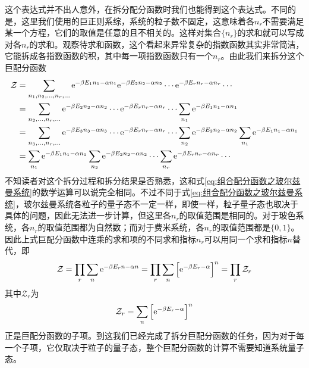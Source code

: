 \documentclass[../../main.tex]{subfiles}
\begin{document}
这个表达式并不出人意外，在拆分配分函数时我们也能得到这个表达式。不同的是，这里我们使用的巨正则系综，系统的粒子数不固定，这意味着各\(n_r\)不需要满足某一个方程，它们的取值是任意的且不相关的。这样对集合\(\{n_r\}\)的求和就可以写成对各\(n_r\)的求和。观察待求和函数，这个看起来异常复杂的指数函数其实非常简洁，它能拆成各指数函数的积，其中每一项指数函数只有一个\(n_r\)。由此我们来拆分这个巨配分函数
\begin{equation}\label{eq:拆分巨配分函数}
    \begin{split}
        \mathcal{Z}&=\sum_{n_1,n_2,\dots,n_r,\dots}\mathrm{e}^{-\beta E_1n_1-\alpha n_1}\mathrm{e}^{-\beta E_2n_2-\alpha n_2}\cdots\mathrm{e}^{-\beta E_rn_r-\alpha n_r}\cdots \\
        &=\sum_{n_2,\dots,n_r,\dots}\mathrm{e}^{-\beta E_2n_2-\alpha n_2}\cdots\mathrm{e}^{-\beta E_rn_r-\alpha n_r}\cdots\sum_{n_1}\mathrm{e}^{-\beta E_1n_1-\alpha n_1} \\
        &=\sum_{n_3,\dots,n_r,\dots}\mathrm{e}^{-\beta E_3n_3-\alpha n_3}\cdots\mathrm{e}^{-\beta E_rn_r-\alpha n_r}\cdots\sum_{n_2}\mathrm{e}^{-\beta E_2n_2-\alpha n_2}\sum_{n_1}\mathrm{e}^{-\beta E_1n_1-\alpha n_1} \\
        &=\sum_{n_1}\mathrm{e}^{-\beta E_1n_1-\alpha n_1}\sum_{n_2}\mathrm{e}^{-\beta E_2n_2-\alpha n_2}\cdots\sum_{n_r}\mathrm{e}^{-\beta E_rn_r-\alpha n_r}\cdots
    \end{split}
\end{equation}
不知读者对这个拆分过程和拆分结果是否熟悉，这和式\eqref{eq:组合配分函数之玻尔兹曼系统}的数学运算可以说完全相同。不过不同于式\eqref{eq:组合配分函数之玻尔兹曼系统}，玻尔兹曼系统各粒子的量子态不一定一样，即使一样，粒子量子态也取决于具体的问题，因此无法进一步计算，但这里各\(n_r\)的取值范围是相同的。对于玻色系统，各\(n_r\)的取值范围都为自然数；而对于费米系统，各\(n_r\)的取值范围都是\(\{0,1\}\)。因此上式巨配分函数中连乘的求和项的不同求和指标\(n_r\)可以用同一个求和指标\(n\)替代，即
\begin{equation}
    \mathcal{Z}=\prod_r\sum_{n}\mathrm{e}^{-\beta E_rn-\alpha n}=\prod_r\sum_n\Big[\mathrm{e}^{-\beta E_r-\alpha}\Big]^n=\prod_r \mathcal{Z}_r
\end{equation}
其中\(\mathcal{Z}_r\)为
\begin{equation}
    \mathcal{Z}_r=\sum_n\Big[\mathrm{e}^{-\beta E_r-\alpha}\Big]^n
\end{equation}
正是巨配分函数的子项。到这我们已经完成了拆分巨配分函数的任务，因为对于每一个子项，它仅取决于粒子的量子态，整个巨配分函数的计算不需要知道系统量子态。
\end{document}
